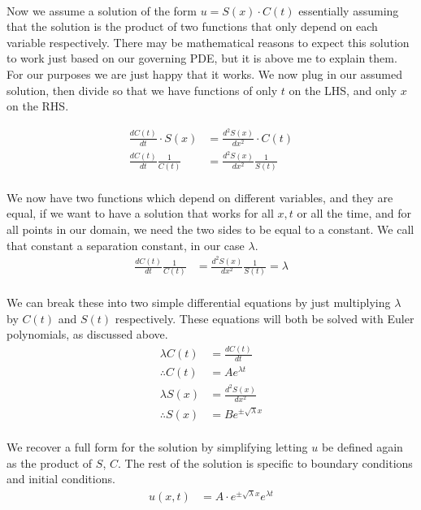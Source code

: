 \documentclass{article}
\begin{document}
	\paragraph{}
	Now we assume a solution of the form $u = S(x) \cdot C(t)$ essentially assuming that the solution is the product of two functions that only depend on each variable respectively. There may be mathematical reasons to expect this solution to work just based on our governing PDE, but it is above me to explain them. For our purposes we are just happy that it works. We now plug in our assumed solution, then divide so that we have functions of only $t$ on the LHS, and only $x$ on the RHS.
	
	\begin{align}
		\frac{dC(t)}{dt} \cdot S(x) &= \frac{d^{2}S(x)}{dx^{2}} \cdot C(t)\\
		\frac{dC(t)}{dt} \frac{1}{C(t)} &= \frac{d^{2}S(x)}{dx^{2}} \frac{1}{S(t)}
	\end{align}
	\paragraph{}
	We now have two functions which depend on different variables, and they are equal, if we want to have a solution that works for all $x,t$ or all the time, and for all points in our domain, we need the two sides to be equal to a constant. We call that constant a separation constant, in our case $\lambda$.
	\begin{align}
		\frac{dC(t)}{dt} \frac{1}{C(t)} &= \frac{d^{2}S(x)}{dx^{2}} \frac{1}{S(t)} = \lambda
	\end{align}
	\paragraph{}
	We can break these into two simple differential equations by just multiplying $\lambda$ by $C(t)$ and $S(t)$ respectively. These equations will both be solved with Euler polynomials, as discussed above.
	\begin{align}
		\lambda C(t) &= \frac{dC(t)}{dt}\\
		\therefore C(t) &= Ae^{\lambda t}\\
		\lambda S(x) &= \frac{d^{2}S(x)}{dx^{2}}\\
		\therefore S(x) &= Be^{\pm \sqrt{\lambda} x}
	\end{align}
	\paragraph{}
	We recover a full form for the solution by simplifying letting $u$ be defined again as the product of $S$, $C$. The rest of the solution is specific to boundary conditions and initial conditions.
	\begin{align}
		u(x,t) &= A \cdot e^{\pm \sqrt{\lambda} x} e^{\lambda t}
	\end{align}
	
\end{document}
